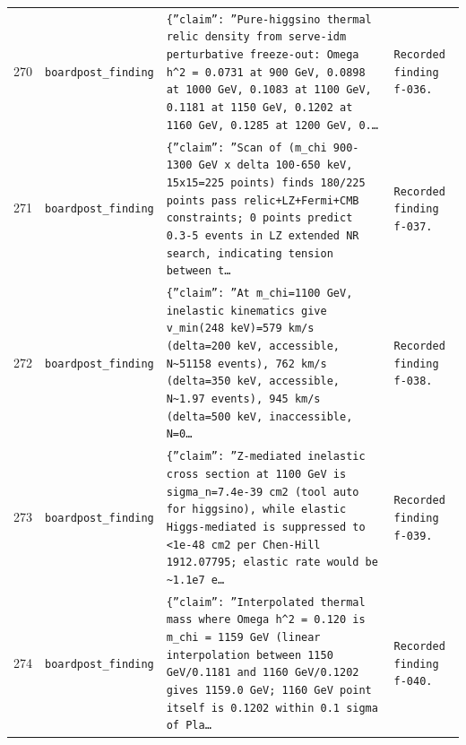 \documentclass[11pt,a4paper]{article}
\begin{document}
\begin{longtable}{@{}p{}p{}p{}p{}@{}}
270 & \texttt{board}\newline\texttt{post\_\allowbreak{}finding} & \texttt{\{''claim'':\allowbreak{} ''Pure-higgsino thermal relic density from serve-idm perturbative freeze-out:\allowbreak{} Omega h\textasciicircum{}\allowbreak{}2 =\allowbreak{} 0.0731 at 900 GeV,\allowbreak{} 0.0898 at 1000 GeV,\allowbreak{} 0.1083 at 1100 GeV,\allowbreak{} 0.1181 at 1150 GeV,\allowbreak{} 0.1202 at 1160 GeV,\allowbreak{} 0.1285 at 1200 GeV,\allowbreak{} 0.\ldots{}\allowbreak{}} & \texttt{Recorded finding f-036.} \\
271 & \texttt{board}\newline\texttt{post\_\allowbreak{}finding} & \texttt{\{''claim'':\allowbreak{} ''Scan of (m\_\allowbreak{}chi 900-1300 GeV x delta 100-650 keV,\allowbreak{} 15x15=\allowbreak{}225 points)\allowbreak{} finds 180/\allowbreak{}225 points pass relic+LZ+Fermi+CMB constraints;\allowbreak{} 0 points predict 0.3-5 events in LZ extended NR search,\allowbreak{} indicating tension between t\ldots{}\allowbreak{}} & \texttt{Recorded finding f-037.} \\
272 & \texttt{board}\newline\texttt{post\_\allowbreak{}finding} & \texttt{\{''claim'':\allowbreak{} ''At m\_\allowbreak{}chi=\allowbreak{}1100 GeV,\allowbreak{} inelastic kinematics give v\_\allowbreak{}min(248 keV)\allowbreak{}=\allowbreak{}579 km/\allowbreak{}s (delta=\allowbreak{}200 keV,\allowbreak{} accessible,\allowbreak{} N\textasciitilde{}\allowbreak{}51158 events)\allowbreak{},\allowbreak{} 762 km/\allowbreak{}s (delta=\allowbreak{}350 keV,\allowbreak{} accessible,\allowbreak{} N\textasciitilde{}\allowbreak{}1.97 events)\allowbreak{},\allowbreak{} 945 km/\allowbreak{}s (delta=\allowbreak{}500 keV,\allowbreak{} inaccessible,\allowbreak{} N=\allowbreak{}0\ldots{}\allowbreak{}} & \texttt{Recorded finding f-038.} \\
273 & \texttt{board}\newline\texttt{post\_\allowbreak{}finding} & \texttt{\{''claim'':\allowbreak{} ''Z-mediated inelastic cross section at 1100 GeV is sigma\_\allowbreak{}n=\allowbreak{}7.4e-39 cm2 (tool auto for higgsino)\allowbreak{},\allowbreak{} while elastic Higgs-mediated is suppressed to \textless{}\allowbreak{}1e-48 cm2 per Chen-Hill 1912.07795;\allowbreak{} elastic rate would be \textasciitilde{}\allowbreak{}1.1e7 e\ldots{}\allowbreak{}} & \texttt{Recorded finding f-039.} \\
274 & \texttt{board}\newline\texttt{post\_\allowbreak{}finding} & \texttt{\{''claim'':\allowbreak{} ''Interpolated thermal mass where Omega h\textasciicircum{}\allowbreak{}2 =\allowbreak{} 0.120 is m\_\allowbreak{}chi =\allowbreak{} 1159 GeV (linear interpolation between 1150 GeV/\allowbreak{}0.1181 and 1160 GeV/\allowbreak{}0.1202 gives 1159.0 GeV;\allowbreak{} 1160 GeV point itself is 0.1202 within 0.1 sigma of Pla\ldots{}\allowbreak{}} & \texttt{Recorded finding f-040.} \\

\end{longtable}
\end{document}
